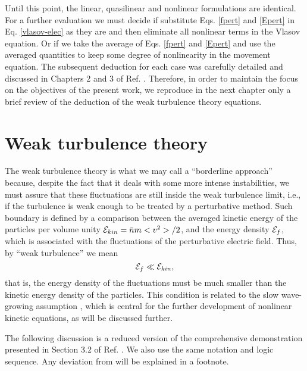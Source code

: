 \documentclass[12pt,a4paper,ruledheader]{report}
\def\calE{{\cal E}}
\begin{document}
Until this point, the linear, quasilinear and nonlinear formulations
are identical. For a further evaluation we must decide if substitute
Eqs. \eqref{fpert} and \eqref{Epert} in Eq. \eqref{vlasov-elec} as they
are and then eliminate all nonlinear terms in the Vlasov equation. Or if
we take the average of Eqs. \eqref{fpert} and \eqref{Epert} and use the
averaged quantities to keep some degree of nonlinearity in the movement
equation. The subsequent deduction for each case was carefully detailed
and discussed in Chapters 2 and 3 of Ref. \cite{Tigik2015}. Therefore,
in order to maintain the focus on the objectives of the present work, we
reproduce in the next chapter only a brief review of the deduction of
the weak turbulence theory equations. 



\chapter{Weak turbulence theory}
\label{cha:weak-turb}
The weak turbulence theory is what we may call a ``borderline approach''
because, despite the fact that it deals with some more intense
instabilities, we must assure that these fluctuations are still inside
the weak turbulence limit, i.e., if the turbulence is weak enough to be
treated by a perturbative method. Such boundary is defined by a comparison
between the averaged kinetic energy of the particles per volume unity
$\calE_{kin}=\bar n m<v^2>/2$, and the energy density $\calE_f$, which
is associated with the fluctuations of the perturbative electric field.
Thus, by ``weak turbulence'' we mean
\begin{equation}
  \label{eq:weak}
  \calE_f \ll \calE_{kin},
\end{equation}
that is,
the energy density of the fluctuations must be much smaller
than the kinetic energy density of the particles. This condition is
related to the slow wave-growing assumption \cite{david}, which is
central for the further development of nonlinear kinetic equations,
as will be discussed further.

The following discussion is a reduced version of the
comprehensive demonstration presented in Section 3.2 of
Ref. \cite{Tigik2015}. We also use the same notation and
logic sequence. Any deviation from \cite{Tigik2015} will
be explained in a footnote.
\end{document}
